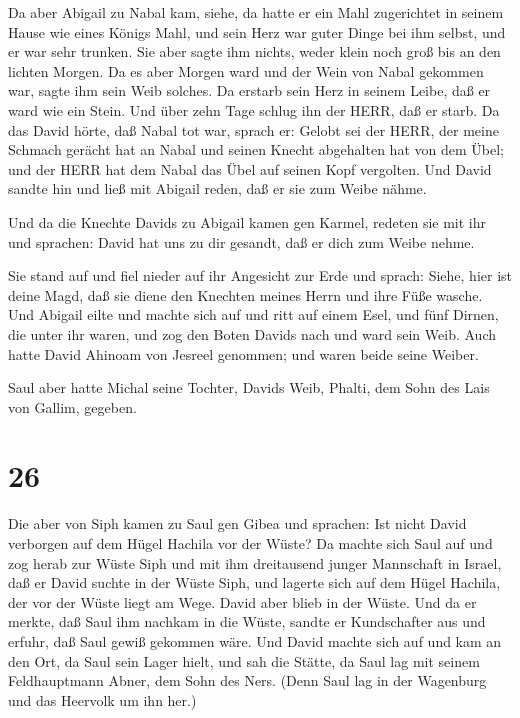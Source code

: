  Da aber Abigail zu Nabal kam, siehe, da hatte er ein Mahl
zugerichtet in seinem Hause wie eines Königs Mahl, und sein Herz war
guter Dinge bei ihm selbst, und er war sehr trunken. Sie aber sagte ihm
nichts, weder klein noch groß bis an den lichten Morgen. 
Da es aber Morgen ward und der Wein von Nabal gekommen war, sagte ihm
sein Weib solches. Da erstarb sein Herz in seinem Leibe, daß er ward wie
ein Stein.  Und über zehn Tage schlug ihn der HERR, daß er
starb.  Da das David hörte, daß Nabal tot war, sprach er:
Gelobt sei der HERR, der meine Schmach gerächt hat an Nabal und seinen
Knecht abgehalten hat von dem Übel; und der HERR hat dem Nabal das Übel
auf seinen Kopf vergolten. Und David sandte hin und ließ mit Abigail
reden, daß er sie zum Weibe nähme.

 Und da die Knechte Davids zu Abigail kamen gen Karmel,
redeten sie mit ihr und sprachen: David hat uns zu dir gesandt, daß er
dich zum Weibe nehme.

 Sie stand auf und fiel nieder auf ihr Angesicht zur Erde
und sprach: Siehe, hier ist deine Magd, daß sie diene den Knechten
meines Herrn und ihre Füße wasche.  Und Abigail eilte und
machte sich auf und ritt auf einem Esel, und fünf Dirnen, die unter ihr
waren, und zog den Boten Davids nach und ward sein Weib. 
Auch hatte David Ahinoam von Jesreel genommen; und waren beide seine
Weiber.

 Saul aber hatte Michal seine Tochter, Davids Weib, Phalti,
dem Sohn des Lais von Gallim, gegeben.

\hypertarget{section-25}{%
\section{26}\label{section-25}}

 Die aber von Siph kamen zu Saul gen Gibea und sprachen: Ist
nicht David verborgen auf dem Hügel Hachila vor der Wüste? 
Da machte sich Saul auf und zog herab zur Wüste Siph und mit ihm
dreitausend junger Mannschaft in Israel, daß er David suchte in der
Wüste Siph,  und lagerte sich auf dem Hügel Hachila, der vor
der Wüste liegt am Wege. David aber blieb in der Wüste. Und da er
merkte, daß Saul ihm nachkam in die Wüste,  sandte er
Kundschafter aus und erfuhr, daß Saul gewiß gekommen wäre. 
Und David machte sich auf und kam an den Ort, da Saul sein Lager hielt,
und sah die Stätte, da Saul lag mit seinem Feldhauptmann Abner, dem Sohn
des Ners. (Denn Saul lag in der Wagenburg und das Heervolk um ihn her.)

